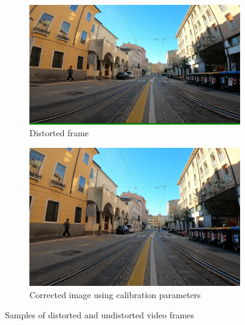 \documentclass[11pt]{article}
\begin{document}
    \begin{figure}
        \centering
        \begin{subfigure}{0.45\textwidth}
            \centering
            \includegraphics[width=\linewidth]{images/experiment/img_distorted}
            \caption{Distorted frame}
        \end{subfigure}
        \hfill
        \begin{subfigure}{0.45\textwidth}
            \centering
            \includegraphics[width=\linewidth]{images/experiment/img_undistorted}
            \caption{Corrected image using calibration parameters}
        \end{subfigure}
        \caption{Samples of distorted and undistorted video frames}
        \label{fig:img_distorted}
    \end{figure}
\end{document}
